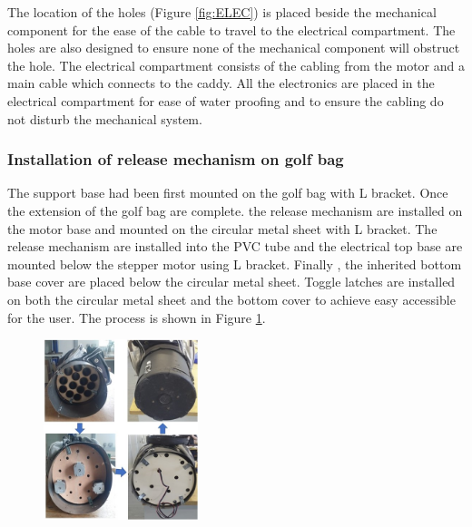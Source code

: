 \documentclass[11pt,landscape]{article}
\begin{document}
\begin{multicols}{2}
    The location of the holes (Figure \ref{fig:ELEC}) is placed beside the
    mechanical component for the ease of the cable to travel to the electrical
    compartment. The holes are also designed to ensure none of the mechanical
    component will obstruct the hole. The electrical compartment consists of the
    cabling from the motor and a main cable which connects to the caddy. All the
    electronics are placed in the electrical compartment for ease of water
    proofing and to ensure the cabling do not disturb the mechanical system. 
    
    \subsubsection{Installation of release mechanism on golf bag }
    The support base had been first mounted on the golf bag with L bracket. Once
    the extension of the golf bag are complete. the release mechanism are
    installed on the motor base and mounted on the circular metal sheet with L
    bracket. The release mechanism are installed into the PVC tube and the
    electrical top base are mounted below the stepper motor using L bracket.
    Finally , the inherited bottom base cover are placed below the circular
    metal sheet. Toggle latches are installed on both the circular metal sheet
    and the bottom cover to achieve easy accessible for the user. The process is
    shown in Figure \ref{fig:installation}.
    \begin{figure}[H]
        \begin{center}
            \includegraphics[width=0.4\textwidth]{Figure30.jpg}
            \label{fig:installation}
        \end{center}
    \end{figure}
\end{multicols}
\end{document}
